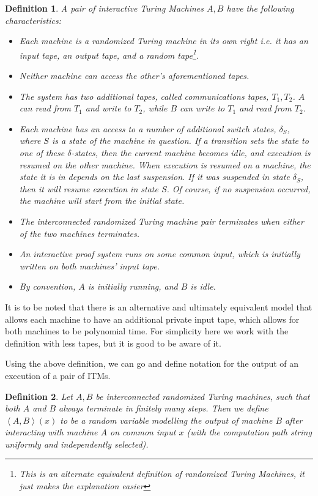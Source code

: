 \documentclass{article}
\newtheorem{definition}{Definition}
\begin{document}
\begin{definition}
    A pair of interactive Turing Machines $A, B$ have the following characteristics:
    \begin{itemize}
        \item Each machine is a randomized Turing machine in its own right i.e. it has an input tape, an output tape, and a random tape\footnote{This is an alternate equivalent definition of randomized Turing Machines, it just makes the explanation easier}.
        \item Neither machine can access the other's aforementioned tapes.
        \item The system has two additional tapes, called communications tapes, $T_1, T_2$. $A$ can read from $T_1$ and write to $T_2$, while $B$ can write to $T_1$ and read from $T_2$.
        \item Each machine has an access to a number of additional switch states, $\delta_S$, where $S$ is a state of the machine in question. If a transition sets the state to one of these $\delta$-states, then the current machine becomes idle, and execution is resumed on the other machine. When execution is resumed on a machine, the state it is in depends on the last suspension. If it was suspended in state $\delta_S$, then it will resume execution in state $S$. Of course, if no suspension occurred, the machine will start from the initial state.
        \item The interconnected randomized Turing machine pair terminates when either of the two machines terminates.
        \item An interactive proof system runs on some common input, which is initially written on both machines' input tape.
        \item By convention, $A$ is initially running, and $B$ is idle.
    \end{itemize}
\end{definition}

It is to be noted that there is an alternative and ultimately equivalent model that allows each machine to have an additional private input tape, which allows for both machines to be polynomial time. For simplicity here we work with the definition with less tapes, but it is good to be aware of it.

Using the above definition, we can go and define notation for the output of an execution of a pair of ITMs.

\begin{definition}
    Let $A, B$ be interconnected randomized Turing machines, such that both $A$ and $B$ always terminate in finitely many steps. Then we define $\left<A, B \right>(x)$ to be a random variable modelling the output of machine $B$ after interacting with machine $A$ on common input $x$ (with the computation path string uniformly and independently selected).
\end{definition}
\end{document}
